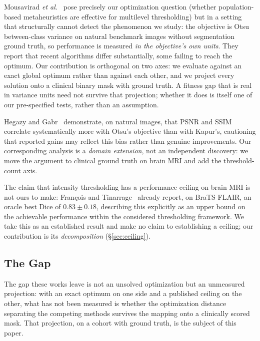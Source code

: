 Mousavirad \emph{et al.}~\cite{mousavirad_kbs} pose precisely our optimization
question (whether population-based metaheuristics are effective for
multilevel thresholding) but in a setting that structurally cannot detect the
phenomenon we study: the objective is Otsu between-class variance on natural
benchmark images without segmentation ground truth, so performance is measured
\emph{in the objective's own units}. They report that recent algorithms differ
substantially, some failing to reach the optimum.
Our contribution is orthogonal on two axes: we evaluate against an exact global
optimum rather than against each other, and we project every solution onto a
clinical binary mask with ground truth. A fitness gap that is real in variance
units need not survive that projection; whether it does is itself one of our
pre-specified tests, rather than an assumption.

Hegazy and Gabr~\cite{hegazy_metricbias} demonstrate, on natural images, that
PSNR and SSIM correlate systematically more with Otsu's objective than with
Kapur's, cautioning that reported gains may reflect this bias rather than
genuine improvements. Our corresponding analysis is a \emph{domain extension},
not an independent discovery: we move the argument to clinical ground truth on
brain MRI and add the threshold-count axis.

The claim that intensity thresholding has a performance ceiling on brain MRI is
not ours to make: François and Tinarrage~\cite{francois_jmiv} already report, on
BraTS FLAIR, an oracle best Dice of $0.83 \pm 0.18$, describing this explicitly
as an upper bound on the achievable performance within the considered
thresholding framework. We take this as an established result and make no claim
to establishing a ceiling; our contribution is its \emph{decomposition}
(§\ref{sec:ceiling}).

\subsection{The Gap}

The gap these works leave is not an unsolved optimization but an unmeasured
projection: with an exact optimum on one side and a published ceiling on the
other, what has not been measured is whether the optimization distance separating
the competing methods survives the mapping onto a clinically scored mask. That
projection, on a cohort with ground truth, is the subject of this paper.
